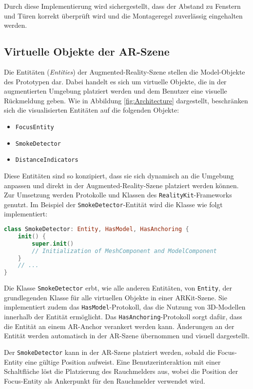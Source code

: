 Durch diese Implementierung wird sichergestellt, dass der Abstand zu Fenstern und Türen korrekt überprüft wird und die Montageregel zuverlässig eingehalten werden.

\subsection{Virtuelle Objekte der AR-Szene}

Die Entitäten (\textit{Entities}) der Augmented-Reality-Szene stellen die Model-Objekte des Prototypen dar. Dabei handelt es sich um virtuelle Objekte, die in der augmentierten Umgebung platziert werden und dem Benutzer eine visuelle Rückmeldung geben. Wie in Abbildung \ref{fig:Architecture} dargestellt, beschränken sich die visualisierten Entitäten auf die folgenden Objekte:

\begin{itemize}
    \item \texttt{FocusEntity}
    \item \texttt{SmokeDetector}
    \item \texttt{DistanceIndicators}
\end{itemize}

Diese Entitäten sind so konzipiert, dass sie sich dynamisch an die Umgebung anpassen und direkt in der Augmented-Reality-Szene platziert werden können. Zur Umsetzung werden Protokolle und Klassen des \texttt{RealityKit}-Frameworks genutzt. Im Beispiel der \texttt{SmokeDetector}-Entität wird die Klasse wie folgt implementiert:

\begin{lstlisting}[language=Swift]
class SmokeDetector: Entity, HasModel, HasAnchoring {
    init() {
        super.init()
        // Initialization of MeshComponent and ModelComponent
    }
    // ...
}
\end{lstlisting}

Die Klasse \texttt{SmokeDetector} erbt, wie alle anderen Entitäten, von \texttt{Entity}, der grundlegenden Klasse für alle virtuellen Objekte in einer ARKit-Szene. Sie implementiert zudem das \texttt{HasModel}-Protokoll, das die Nutzung von 3D-Modellen innerhalb der Entität ermöglicht. Das \texttt{HasAnchoring}-Protokoll sorgt dafür, dass die Entität an einem AR-Anchor verankert werden kann. Änderungen an der Entität werden automatisch in der AR-Szene übernommen und visuell dargestellt.

Der \texttt{SmokeDetector} kann in der AR-Szene platziert werden, sobald die Focus-Entity eine gültige Position aufweist. Eine Benutzerinteraktion mit einer Schaltfläche löst die Platzierung des Rauchmelders aus, wobei die Position der Focus-Entity als Ankerpunkt für den Rauchmelder verwendet wird.

